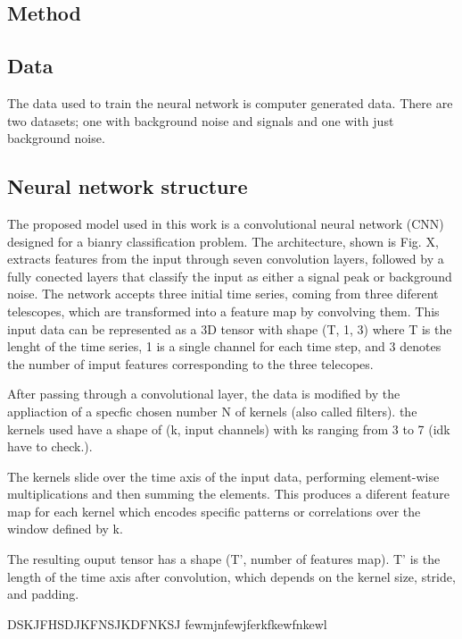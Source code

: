 \documentclass{article}
\begin{document}
\begin{multicols}{2}
\section{Method}
\subsection{Data}
The data used to train the neural network is computer generated data.
There are two datasets; one with background noise and signals and one with just background noise.


\subsection{Neural network structure}

\indent
The proposed model used in this work is a convolutional neural network (CNN) designed for a bianry classification problem.
The architecture, shown is Fig. X, extracts features from the input through seven convolution layers, 
followed by a fully conected layers that classify the input as either a signal peak or background noise.
The network accepts three initial time series, coming from three diferent telescopes, which are transformed into a feature map by convolving them.
This input data can be represented as a 3D tensor with shape (T, 1, 3) where T is the lenght of the time series,
1 is a single channel for each time step, and 3 denotes the number of imput features corresponding to the three telecopes.

After passing through a convolutional layer, the data is modified by the appliaction of a specfic chosen number N of kernels (also called filters).
the kernels used have a shape of (k, input channels) with ks ranging from 3 to 7 (idk have to check.).

The kernels slide over the time axis of the input data, performing element-wise multiplications and then summing the elements. 
This produces a diferent feature map for each kernel which encodes specific patterns or correlations over the window defined by k.

The resulting ouput tensor has a shape (T', number of features map). T' is the length of the time axis after convolution, 
which depends on the kernel size, stride, and padding.

DSKJFHSDJKFNSJKDFNKSJ fewmjnfewjferkfkewfnkewl







\end{multicols}
\end{document}
